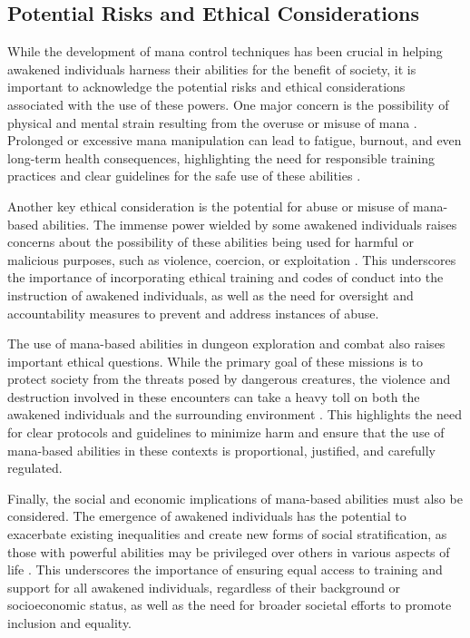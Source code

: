 \documentclass[12pt, a4paper]{article}
\begin{document}
\subsection{Potential Risks and Ethical Considerations}
While the development of mana control techniques has been crucial in helping awakened individuals harness their abilities for the benefit of society, it is important to acknowledge the potential risks and ethical considerations associated with the use of these powers. One major concern is the possibility of physical and mental strain resulting from the overuse or misuse of mana \cite{Chen2026}. Prolonged or excessive mana manipulation can lead to fatigue, burnout, and even long-term health consequences, highlighting the need for responsible training practices and clear guidelines for the safe use of these abilities \cite{Muller2027}.

Another key ethical consideration is the potential for abuse or misuse of mana-based abilities. The immense power wielded by some awakened individuals raises concerns about the possibility of these abilities being used for harmful or malicious purposes, such as violence, coercion, or exploitation \cite{Hofstede2027}. This underscores the importance of incorporating ethical training and codes of conduct into the instruction of awakened individuals, as well as the need for oversight and accountability measures to prevent and address instances of abuse.

The use of mana-based abilities in dungeon exploration and combat also raises important ethical questions. While the primary goal of these missions is to protect society from the threats posed by dangerous creatures, the violence and destruction involved in these encounters can take a heavy toll on both the awakened individuals and the surrounding environment \cite{Nakamura2027}. This highlights the need for clear protocols and guidelines to minimize harm and ensure that the use of mana-based abilities in these contexts is proportional, justified, and carefully regulated.

Finally, the social and economic implications of mana-based abilities must also be considered. The emergence of awakened individuals has the potential to exacerbate existing inequalities and create new forms of social stratification, as those with powerful abilities may be privileged over others in various aspects of life \cite{Seo2027}. This underscores the importance of ensuring equal access to training and support for all awakened individuals, regardless of their background or socioeconomic status, as well as the need for broader societal efforts to promote inclusion and equality.
\end{document}
